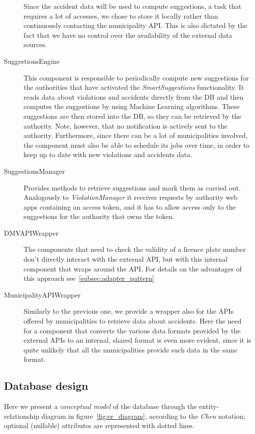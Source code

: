\begin{description}
    Since the accident data will be used to compute suggestions, a task that
    requires a lot of accesses, we chose to store it locally rather than
    continuously contacting the municipality API. This is also dictated by
    the fact that we have no control over the availability of the external
    data sources.
    \item[SuggestionsEngine] This component is responsible to periodically
    compute new suggestions for the authorities that have activated the
    \emph{SmartSuggestions} functionality.
    It reads data about violations and accidents directly from the DB and
    then computes the suggestions by using Machine Learning algorithms.
    These suggestions are then stored into the DB, so they can be retrieved
    by the authority. Note, however, that no notification is actively sent to
    the authority.
    Furthermore, since there can be a lot of municipalities involved, the
    component must also be able to schedule its jobs over time, in order to
    keep up to date with new violations and accidents data.
    \item[SuggestionsManager] Provides methods to retrieve suggestions and
    mark them as carried out. Analogously to \emph{ViolationManager} it receives
    requests by authority web apps containing an access token, and it has to
    allow access only to the suggestions for the authority that owns the token.
    \item[DMVAPIWrapper] The components that need to check the validity of
    a licence plate number don't directly interact with the external API, but
    with this internal component that wraps around the API.
    For details on the advantages of this approach
    see~\ref{subsec:adapter_pattern}
    \item[MunicipalityAPIWrapper] Similarly to the previous one, we provide a
    wrapper also for the APIs offered by municipalities to retrieve data about
    accidents. Here the need for a component that converts the various data
    formats provided by the external APIs to an internal, shared format is
    even more evident, since it is quite unlikely that all the municipalities
    provide such data in the same format.
\end{description}

\clearpage

\subsection{Database design}
Here we present a \emph{conceptual model} of the database through the
entity-relationship diagram in figure~\vref{fig:er_diagram}, according to
the \emph{Chen} notation;
optional (nullable) attributes are represented with dotted lines.

